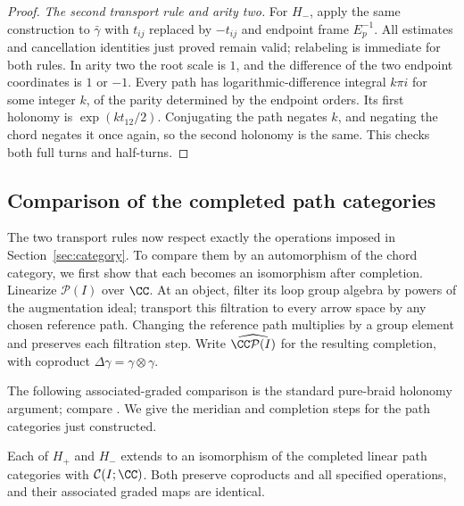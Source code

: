 \begin{proof}
\emph{The second transport rule and arity two.}
For $H_-$, apply the same construction to $\bar\gamma$ with
$t_{ij}$ replaced by $-t_{ij}$ and endpoint frame $E_p^{-1}$.
All estimates and cancellation identities just proved remain valid;
relabeling is immediate for both rules.  In arity two the root scale
is $1$, and the difference of the two endpoint coordinates is $1$ or
$-1$.  Every path has logarithmic-difference integral $k\pi i$ for
some integer $k$, of the parity determined by the endpoint orders.
Its first holonomy is $\exp(kt_{12}/2)$.  Conjugating the path negates
$k$, and negating the chord negates it once again, so the second
holonomy is the same.  This checks both full turns and half-turns.
\end{proof}

\subsection{Comparison of the completed path categories}
The two transport rules now respect exactly the operations imposed in
Section~\ref{sec:category}.  To compare them by an automorphism of the
chord category, we first show that each becomes an isomorphism after
completion.
Linearize $\mathcal P(I)$ over $\CC$.
At an object, filter its loop group algebra by powers
of the augmentation ideal; transport this filtration to every arrow
space by any chosen reference path.  Changing the reference path
multiplies by a group element and preserves each filtration step.
Write $\widehat{\CC\mathcal P(I)}$ for the resulting completion, with
coproduct $\Delta\gamma=\gamma\otimes\gamma$.

The following associated-graded comparison is the standard pure-braid
holonomy argument; compare \cite[Proposition~3.6]{BarNatan}.
We give the meridian and completion steps for the path categories just
constructed.

\begin{lemma}\label{lem:holonomy-isomorphism}
Each of $H_+$ and $H_-$ extends to an isomorphism of the completed
linear path categories with $\mathcal C(I;\CC)$.  Both preserve
coproducts and all specified operations, and their associated graded
maps are identical.
\end{lemma}

